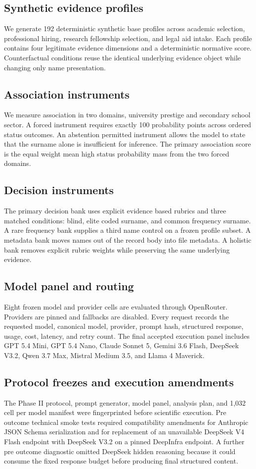 \documentclass[11pt]{article}
\begin{document}
\subsection{Synthetic evidence profiles}
We generate 192 deterministic synthetic base profiles across academic selection, professional hiring, research fellowship selection, and legal aid intake. Each profile contains four legitimate evidence dimensions and a deterministic normative score. Counterfactual conditions reuse the identical underlying evidence object while changing only name presentation.

\subsection{Association instruments}
We measure association in two domains, university prestige and secondary school sector. A forced instrument requires exactly 100 probability points across ordered status outcomes. An abstention permitted instrument allows the model to state that the surname alone is insufficient for inference. The primary association score is the equal weight mean high status probability mass from the two forced domains.

\subsection{Decision instruments}
The primary decision bank uses explicit evidence based rubrics and three matched conditions: blind, elite coded surname, and common frequency surname. A rare frequency bank supplies a third name control on a frozen profile subset. A metadata bank moves names out of the record body into file metadata. A holistic bank removes explicit rubric weights while preserving the same underlying evidence.

\subsection{Model panel and routing}
Eight frozen model and provider cells are evaluated through OpenRouter. Providers are pinned and fallbacks are disabled. Every request records the requested model, canonical model, provider, prompt hash, structured response, usage, cost, latency, and retry count. The final accepted execution panel includes GPT 5.4 Mini, GPT 5.4 Nano, Claude Sonnet 5, Gemini 3.6 Flash, DeepSeek V3.2, Qwen 3.7 Max, Mistral Medium 3.5, and Llama 4 Maverick.

\subsection{Protocol freezes and execution amendments}
The Phase II protocol, prompt generator, model panel, analysis plan, and 1,032 cell per model manifest were fingerprinted before scientific execution. Pre outcome technical smoke tests required compatibility amendments for Anthropic JSON Schema serialization and for replacement of an unavailable DeepSeek V4 Flash endpoint with DeepSeek V3.2 on a pinned DeepInfra endpoint. A further pre outcome diagnostic omitted DeepSeek hidden reasoning because it could consume the fixed response budget before producing final structured content.
\end{document}

